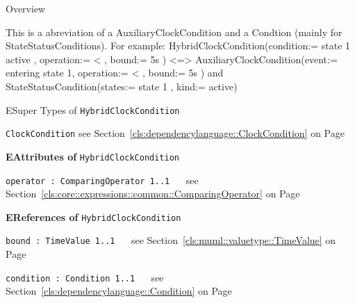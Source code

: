 	\begin{longdescription}
		\item[Overview] 		
				

	

		This is a abreviation of a AuxiliaryClockCondition and a Condtion (mainly for StateStatusConditions).
For example:
HybridClockCondition(condition:= state 1 active ,  operation:= < , bound:= 5s )
<=>
AuxiliaryClockCondition(event:= entering state 1,  operation:= < , bound:= 5s ) and StateStatusCondition(states:= state 1 , kind:= active)		
		\item[ESuper Types of \texttt{HybridClockCondition}] ~
			\begin{longdescription}
				\item[\texttt{ClockCondition}] see Section~\ref{cls:dependencylanguage::ClockCondition} on Page~\pageref{cls:dependencylanguage::ClockCondition}						\end{longdescription}
		
	
			\item[\textbf{EAttributes of} \texttt{HybridClockCondition}] ~
			\begin{longdescription}
	\item[\texttt{operator : ComparingOperator \symbol{"5B}1..1\symbol{"5D}
}] ~
	see Section~\ref{cls:core::expressions::common::ComparingOperator} on Page~\pageref{cls:core::expressions::common::ComparingOperator}
	
	\nopagebreak
		
				

	

	
			\end{longdescription}
			\item[\textbf{EReferences of} \texttt{HybridClockCondition}] ~
			\begin{longdescription}
	\item[\texttt{bound : TimeValue \symbol{"5B}1..1\symbol{"5D}
}] ~
	see Section~\ref{cls:muml::valuetype::TimeValue} on Page~\pageref{cls:muml::valuetype::TimeValue}
	
	\nopagebreak
		
				

	

	
	\item[\texttt{condition : Condition \symbol{"5B}1..1\symbol{"5D}
}] ~
	see Section~\ref{cls:dependencylanguage::Condition} on Page~\pageref{cls:dependencylanguage::Condition}
	
	\nopagebreak
		
				

	

	
			\end{longdescription}
	
	\end{longdescription}
	

